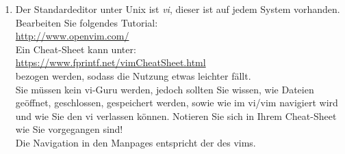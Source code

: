 \documentclass[paper=a4,fontsize=11pt]{scrartcl}%
\numberwithin{equation}{section}
\begin{document}
\begin{enumerate}
	\item Der Standardeditor unter Unix ist \emph{vi}, dieser ist auf jedem System vorhanden. Bearbeiten Sie folgendes Tutorial:\\
	\url{http://www.openvim.com/}\\
	Ein Cheat-Sheet kann unter:\\
	\url{https://www.fprintf.net/vimCheatSheet.html}\\
	bezogen werden, sodass die Nutzung etwas leichter fällt.\\
	Sie müssen kein vi-Guru werden, jedoch sollten Sie wissen, wie Dateien geöffnet, geschlossen, gespeichert werden, sowie wie im vi/vim navigiert wird und wie Sie den vi verlassen können. Notieren Sie sich in Ihrem Cheat-Sheet wie Sie vorgegangen sind!\\
	Die Navigation in den Manpages entspricht der des vims.
\end{enumerate}
\end{document}
